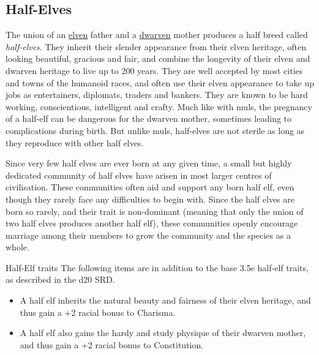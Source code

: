 \subsection{Half-Elves}
\label{sec:Half-Elves}

The union of an \hyperref[sec:Elves]{elven} father and a
\hyperref[sec:Dwarves]{dwarven} mother produces a half breed called
\emph{half-elves}. They inherit their slender appearance from their elven
heritage, often looking beautiful, gracious and fair, and combine the
longevity of their elven and dwarven heritage to live up to 200 years. They
are well accepted by most cities and towns of the humanoid races, and often
use their elven appearance to take up jobs as entertainers, diplomats, traders
and bankers. They are known to be hard working, conscientious, intelligent and
crafty. Much like with muls, the pregnancy of a half-elf can be dangerous
for the dwarven mother, sometimes leading to complications during birth. But
unlike muls, half-elves are not sterile as long as they reproduce with other
half elves.

Since very few half elves are ever born at any given time, a small but highly
dedicated community of half elves have arisen in most larger centres of
civilisation. These communities often aid and support any born half elf, even
though they rarely face any difficulties to begin with. Since the half elves
are born so rarely, and their trait is non-dominant (meaning that only the
union of two half elves produces another half elf), these communities openly
encourage marriage among their members to grow the community and the species
as a whole.

\begin{35e}{Half-Elf traits}
  The following items are in addition to the base 3.5e half-elf traits, as
  described in the d20 SRD.
  \begin{itemize}[noitemsep]
  \item A half elf inherits the natural beauty and fairness of their elven
    heritage, and thus gain a +2 racial bonus to Charisma.
  \item A half elf also gains the hardy and study physique of their dwarven
    mother, and thus gain a +2 racial bonus to Constitution.
  \end{itemize}
\end{35e}
